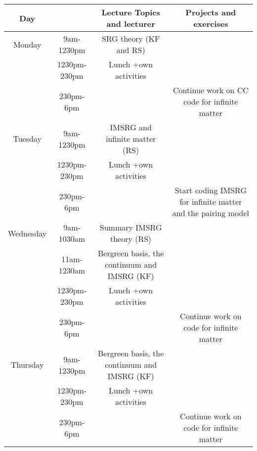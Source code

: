 \documentclass{beamer}
\begin{document}
\begin{frame}
\begin{block}{}
{\footnotesize
\begin{tabular}{cccc}
\hline
\multicolumn{1}{c}{ Day } & \multicolumn{1}{c}{  } & \multicolumn{1}{c}{ Lecture Topics and lecturer } & \multicolumn{1}{c}{ Projects and exercises } \\
\hline
Monday    & 9am-1230pm   & SRG theory (KF and RS)                               &                                                              \\
          & 1230pm-230pm & Lunch +own activities                                &                                                              \\
          & 230pm-6pm    &                                                      & Continue work on CC code for infinite matter                 \\
\hline
Tuesday   & 9am-1230pm   & IMSRG and infinite matter (RS)                       &                                                              \\
          & 1230pm-230pm & Lunch +own activities                                &                                                              \\
          & 230pm-6pm    &                                                      & Start coding IMSRG for infinite matter and the pairing model \\
\hline
Wednesday & 9am-1030am   & Summary IMSRG theory (RS)                            &                                                              \\
          & 11am-1230am  & Bergreen basis, the continuum and IMSRG (KF)         &                                                              \\
          & 1230pm-230pm & Lunch +own activities                                &                                                              \\
          & 230pm-6pm    &                                                      & Continue work on code for infinite matter                    \\
\hline
Thursday  & 9am-1230pm   & Bergreen basis, the continuum and IMSRG (KF)         &                                                              \\
          & 1230pm-230pm & Lunch +own activities                                &                                                              \\
          & 230pm-6pm    &                                                      & Continue work on code for infinite matter                    \\

\end{tabular}}
\end{block}
\end{frame}
\end{document}
